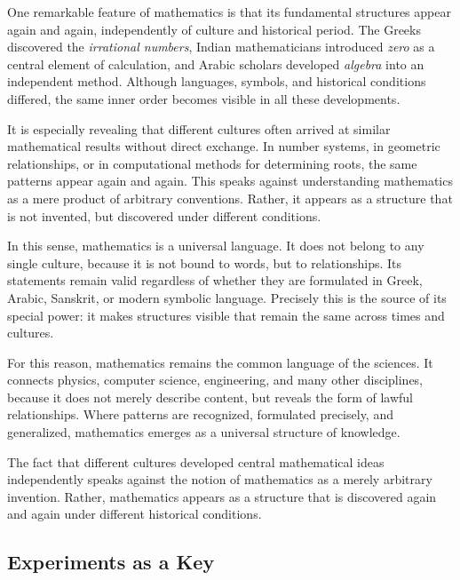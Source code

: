 One remarkable feature of mathematics is that
its fundamental structures appear again and again,
independently of culture and historical period.
The Greeks discovered the \emph{irrational numbers},
Indian mathematicians introduced \emph{zero}
as a central element of calculation,
and Arabic scholars developed \emph{algebra}
into an independent method.
Although languages, symbols, and historical conditions differed,
the same inner order becomes visible in all these developments.

It is especially revealing
that different cultures often arrived at similar mathematical results
without direct exchange.
In number systems,
in geometric relationships,
or in computational methods for determining roots,
the same patterns appear again and again.
This speaks against understanding mathematics
as a mere product of arbitrary conventions.
Rather, it appears as a structure
that is not invented,
but discovered under different conditions.

In this sense, mathematics is a universal language.
It does not belong to any single culture,
because it is not bound to words,
but to relationships.
Its statements remain valid regardless of whether they are formulated
in Greek, Arabic, Sanskrit, or modern symbolic language.
Precisely this is the source of its special power:
it makes structures visible
that remain the same across times and cultures.

For this reason, mathematics remains the common language of the sciences.
It connects physics, computer science, engineering, and many other disciplines,
because it does not merely describe content,
but reveals the form of lawful relationships.
Where patterns are recognized,
formulated precisely,
and generalized,
mathematics emerges as a universal structure of knowledge.

\begin{NoteBox}
	\label{box:discovery}
	\small
	The fact that different cultures developed central mathematical ideas independently
	speaks against the notion of mathematics as a merely arbitrary invention.
	Rather, mathematics appears as a structure
	that is discovered again and again
	under different historical conditions.
\end{NoteBox}


\subsection{Experiments as a Key}

